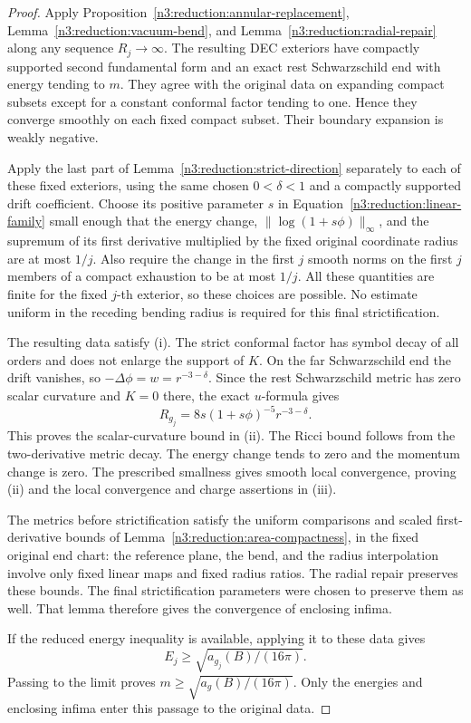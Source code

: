 \begin{proof}
Apply Proposition~\ref{n3:reduction:annular-replacement},
Lemma~\ref{n3:reduction:vacuum-bend}, and
Lemma~\ref{n3:reduction:radial-repair} along any sequence $R_j\to\infty$.
The resulting DEC exteriors have compactly supported second fundamental
form and an exact rest Schwarzschild end with energy tending to $m$.
They agree with the original data on expanding compact subsets except
for a constant conformal factor tending to one.  Hence they converge
smoothly on each fixed compact subset.  Their boundary expansion is
weakly negative.

Apply the last part of Lemma~\ref{n3:reduction:strict-direction} separately
to each of these fixed exteriors, using the same chosen
$0<\delta<1$ and a compactly supported drift coefficient.  Choose its
positive parameter $s$ in Equation~\eqref{n3:reduction:linear-family}
small enough that the energy change, $\|\log(1+s\phi)\|_\infty$, and
the supremum of its first derivative multiplied by the fixed original
coordinate radius are at most $1/j$.  Also require the change in the
first $j$ smooth norms on the first $j$ members of a compact exhaustion
to be at most $1/j$.
All these quantities are finite for the fixed $j$-th exterior, so these
choices are possible.  No estimate uniform in the receding bending
radius is required for this final strictification.

The resulting data satisfy \textup{(i)}. The strict conformal factor has
symbol decay of all orders and does not enlarge the support of $K$.
On the far Schwarzschild end the drift vanishes, so
$-\Delta\phi=w=r^{-3-\delta}$. Since the rest Schwarzschild metric
has zero scalar curvature and $K=0$ there, the exact $u$-formula gives
\[
 R_{g_j}=8s(1+s\phi)^{-5}r^{-3-\delta}.
\]
This proves the scalar-curvature bound in \textup{(ii)}.
The Ricci bound follows from
the two-derivative metric decay. The energy change tends to zero and the
momentum change is zero. The prescribed smallness gives smooth local
convergence, proving \textup{(ii)} and the local convergence and charge
assertions in \textup{(iii)}.

The metrics before strictification satisfy the uniform comparisons and
scaled first-derivative bounds of
Lemma~\ref{n3:reduction:area-compactness}, in the fixed original end chart:
the reference plane, the bend, and the radius interpolation involve only
fixed linear maps and fixed radius ratios.  The radial repair preserves
these bounds.  The final strictification parameters were chosen to
preserve them as well.  That lemma therefore gives the convergence of
enclosing infima.

If the reduced energy inequality is available, applying it to these
data gives
\[
 E_j\ge\sqrt{a_{g_j}(B)/(16\pi)}.
\]
Passing to the limit proves
$m\ge\sqrt{a_g(B)/(16\pi)}$.  Only the energies and enclosing infima
enter this passage to the original data.
\end{proof}
